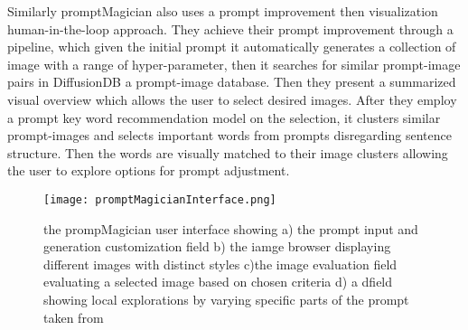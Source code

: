 \documentclass[
  a4paper,  %
  twoside,  %
  bibliography=totoc,
  headsepline,
  cleardoublepage=empty,
  parskip=half,
  draft=false
]{scrbook}
\begin{document}
 
 Similarly promptMagician \cite{PromptMagician} also uses a prompt improvement then visualization human-in-the-loop approach. They achieve their prompt improvement through a pipeline, which 
 given the initial prompt it automatically generates a collection of image with a range of hyper-parameter, then it searches for similar prompt-image pairs in DiffusionDB \cite{diffusiondb} a prompt-image database. Then they present a summarized visual overview which allows the user to select desired images. After they employ a prompt key word recommendation model on the selection, it clusters similar prompt-images and selects important words from prompts disregarding sentence structure. Then the words are visually matched to their image clusters allowing the user to explore options for prompt adjustment.
 
   
  \begin{figure}[H]
 	\centering
 	\texttt{[image: promptMagicianInterface.png]}
 	\caption{the prompMagician user interface showing a) the prompt input and generation customization field b) the iamge browser displaying different images with distinct styles c)the image evaluation field evaluating a selected image based on chosen criteria d) a dfield showing local explorations by varying specific parts of the prompt  taken from \cite{PromptMagician}}
 	\label{fig:promptMagician}
 \end{figure}
 
 
 
 
 
 
  
\end{document}
